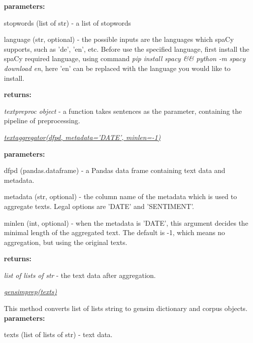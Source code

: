 \documentclass{article} %
\begin{document}
    \textbf{parameters: }
    \begin{compactitem}
        \item stopwords (list of str) - a list of stopwords
        \item language (str, optional) - the possible inputs are the languages which spaCy supports, such as 'de', 'en', etc. Before use the specified language, first install the spaCy required language, using command \textit{pip install spacy \&\& python -m spacy download en}, here 'en' can be replaced with the language you would like to install.
    \end{compactitem}

    \textbf{returns:}
    \begin{compactitem}
        \item \textit{text\textunderscore{}preproc object} - a function takes sentences as the parameter, containing the pipeline of preprocessing.
    \end{compactitem}

    \underline{\textit{text\textunderscore{}aggregator(df\textunderscore{}pd, metadata='DATE', min\textunderscore{}len=-1)}}

    \textbf{parameters: }
    \begin{compactitem}
        \item df\textunderscore{}pd (pandas.dataframe) - a Pandas data frame containing text data and metadata.
        \item metadata (str, optional) - the column name of the metadata which is used to aggregate texts. Legal options are 'DATE' and 'SENTIMENT'.
        \item min\textunderscore{}len (int, optional) - when the metadata is 'DATE', this argument decides the minimal length of the aggregated text. The default is -1, which means no aggregation, but using the original texts.
    \end{compactitem}

    \textbf{returns:}
    \begin{compactitem}
        \item \textit{list of lists of str} - the text data after aggregation.
    \end{compactitem}

    \underline{\textit{gensim\textunderscore{}prep(texts)}}

    This method converts list of lists string to gensim dictionary and corpus objects.
    \textbf{parameters: }
    \begin{compactitem}
        \item texts (list of lists of str) - text data.
    \end{compactitem}
\end{document}

